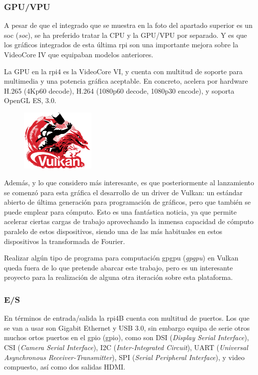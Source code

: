 \subsubsection{GPU/VPU}
A pesar de que el integrado que se muestra en la foto del apartado superior es un \acrshort{soc} (\textit{\acrlong{soc}}), se ha preferido tratar la CPU y la GPU/VPU por separado. Y es que los gráficos integrados de esta última \acrlong{rpi} son una importante mejora sobre la VideoCore IV que equipaban modelos anteriores.

La GPU en la \acrshort{rpi}4 es la VideoCore VI, y cuenta con multitud de soporte para multimedia y una potencia gráfica aceptable. En concreto, acelera por hardware H.265 (4Kp60 decode), H.264 (1080p60 decode, 1080p30 encode), y soporta OpenGL ES, 3.0.

\begin{figure}
  \centering
  \includegraphics[width=0.32\textwidth]{img/vulkan_logo.png}
  \label{fig:vulkan_logo}
\end{figure}
Además, y lo que considero más interesante, es que posteriormente al lanzamiento se comenzó para esta gráfica el desarrollo de un driver de Vulkan: un estándar abierto de última generación para programación de gráficos, pero que también se puede emplear para cómputo. Esto es una fantástica noticia, ya que permite acelerar ciertas cargas de trabajo aprovechando la inmensa capacidad de cómputo paralelo de estos dispositivos, siendo una de las más habituales en estos dispositivos la transformada de Fourier.

Realizar algún tipo de programa para computación \acrshort{gpgpu} (\textit{\acrlong{gpgpu}}) en Vulkan queda fuera de lo que pretende abarcar este trabajo, pero es un interesante proyecto para la realización de alguna otra iteración sobre esta plataforma.

\subsubsection{E/S}
En términos de entrada/salida la \acrshort{rpi}4B cuenta con multitud de puertos. Los que se van a usar son Gigabit Ethernet y USB 3.0, sin embargo equipa de serie otros muchos ortos puertos en el \acrshort{gpio} (\acrlong{gpio}), como son DSI (\textit{Display Serial Interface}), CSI (\textit{Camera Serial Interface}), I2C (\textit{Inter-Integrated Circuit}), UART (\textit{Universal Asynchronous Receiver-Transmitter}), SPI (\textit{Serial Peripheral Interface}), y video compuesto, así como dos salidas HDMI.

